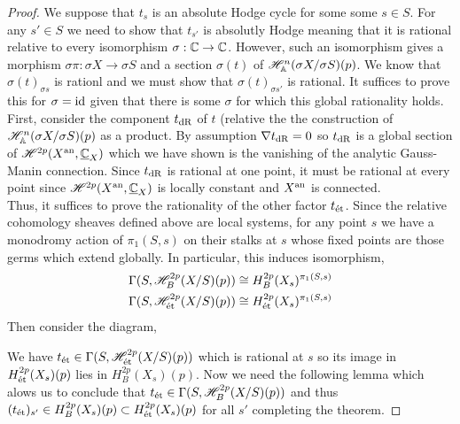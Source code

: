 \documentclass[12pt]{article}
\begin{document}
\begin{proof}
We suppose that $t_s$ is an absolute Hodge cycle for some some $s \in S$. For any $s' \in S$ we need to show that $t_{s'}$ is absolutly Hodge meaning that it is rational relative to every isomorphism $\sigma : \mathbb{C} \to \mathbb{C}$. However, such an isomorphism gives a morphism $\sigma \pi : \sigma X \to \sigma S$ and a section $\sigma(t)$ of $\mathscr{H}^n_{\mathbb{A}}(\sigma X / \sigma S)(p)$. We know that $\sigma(t)_{\sigma s}$ is rationl and we must show that $\sigma(t)_{\sigma s'}$ is rational. It suffices to prove this for $\sigma = \mathrm{id}$ given that there is some $\sigma$ for which this global rationality holds.
\bigskip\\
First, consider the component $t_{\mathrm{dR}}$ of $t$ (relative the the construction of $\mathscr{H}^n_{\mathbb{A}}(\sigma X / \sigma S)(p)$ as a product. By assumption $\nabla t_{\mathrm{dR}} = 0$ so $t_{\mathrm{dR}}$ is a global section of $\mathscr{H}^{2p}(X^{\mathrm{an}}, \underline{\mathbb{C}}_X)$ which we have shown is the vanishing of the analytic Gauss-Manin connection. Since $t_{\mathrm{dR}}$ is rational at one point, it must be rational at every point since $\mathscr{H}^{2p}(X^{\mathrm{an}}, \underline{\mathbb{C}}_X)$ is locally constant and $X^{\mathrm{an}}$ is connected. 
\bigskip\\
Thus, it suffices to prove the rationality of the other factor $t_{\text{\'{e}t}}$. Since the relative cohomology sheaves defined above are local systems, for any point $s$ we have a monodromy action of $\pi_1(S, s)$ on their stalks at $s$ whose fixed points are those germs which extend globally. In particular, this induces isomorphism,
\begin{align*}
\Gamma(S, \mathscr{H}_B^{2p}(X/S)(p)) \cong H^{2p}_B(X_s)^{\pi_1(S,s)}
\\
\Gamma(S, \mathscr{H}_{\text{\'{e}t}}^{2p}(X/S)(p)) \cong H^{2p}_{\text{\'{e}t}}(X_s)^{\pi_1(S,s)}
\end{align*}
Then consider the diagram,
\begin{center}
\end{center}
We have $t_{\text{\'{e}t}} \in \Gamma(S, \mathscr{H}^{2 p}_{\text{\'{e}t}}(X / S)(p))$ which is rational at $s$ so its image in $H^{2 p}_{\text{\'{e}t}}(X_s)(p)$ lies in $H^{2 p}_B(X_s)(p)$. Now we need the following lemma which alows us to conclude that $t_{\text{\'{e}t}} \in \Gamma(S, \mathscr{H}^{2p}_B(X/S)(p))$ and thus $(t_{\text{\'{e}t}})_{s'} \in H^{2 p}_B(X_s)(p) \subset H^{2p}_{\text{\'{e}t}}(X_s)(p)$ for all $s'$ completing the theorem.
\end{proof}
\end{document}
